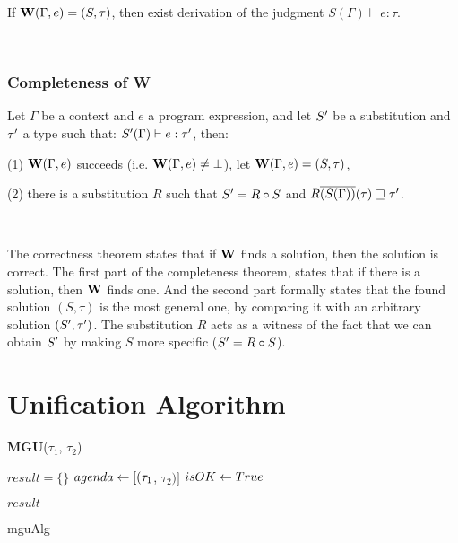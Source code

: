 \documentclass[a4paper,oneside]{memoir}
\begin{document}
If $\operatorname{\textbf{W}}(\Gamma, e) = (S, \tau)$, then exist derivation of the judgment $S(\Gamma) \vdash e : \tau$.

~

\subsubsection{Completeness of W}

Let $\Gamma$ be a context and $e$ a program expression,
and let $S^\prime$ be a substitution and $\tau^\prime$ a type such that:
$ S^\prime(\Gamma) \vdash e : \tau^\prime $, 
then:

(1) $\operatorname{\textbf{W}}(\Gamma,e)$ succeeds (i.e. $\operatorname{\textbf{W}}(\Gamma,e) \neq \bot$), 
let $\operatorname{\textbf{W}}(\Gamma,e) = (S, \tau)$,

(2) there is a substitution $R$ such that $S^\prime = R \circ S$ 
and $R\overline{(S(\Gamma))}(\tau) \sqsupseteq \tau^\prime$. 

~ 

The correctness theorem states that if $\operatorname{\textbf{W}}$ finds a solution, then the solution is correct.
The first part of the completeness theorem, states that if there is a solution, then $\operatorname{\textbf{W}}$ finds one. And the second part formally states that the found solution $(S,\tau)$ is the most general one, by comparing it with an arbitrary solution $(S^\prime,\tau^\prime)$. The substitution $R$ acts as a witness of the fact that we can obtain $S^\prime$ by making $S$ more specific ($S^\prime = R \circ S$).  



\section{Unification Algorithm}

{\textbf{MGU}($\tau_1$, $\tau_2$)}{
	
	$result = \{\}$ \;
	$agenda \leftarrow [(\tau_1$, $\tau_2)]$ \;	
	$isOK \leftarrow True$ \;

	\;	
	
	\;
	
	 {
		\Return $result$
	} \Else {
		\Return $\bot$				
	}
	
}{mguAlg}
\end{document}
